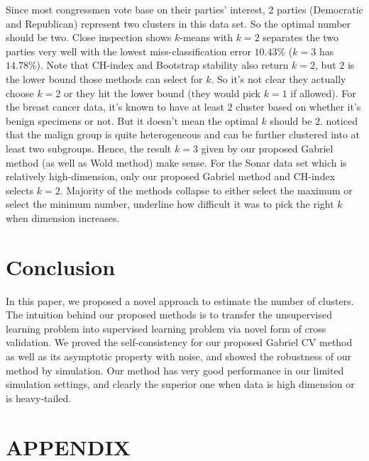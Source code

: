 \documentclass[11pt]{article}
\begin{document}
Since most congressmen vote base on their parties' interest, $2$ parties
(Democratic and Republican) represent two clusters in this data set. So the
optimal number should be two. Close inspection shows $k$-means with
$k=2$ separates the two parties very well with the lowest miss-classification
error $10.43\%$ ($k=3$ has $14.78\%$). Note that CH-index and Bootstrap
stability also return $k=2$, but $2$ is the lower bound those methods can
select for $k$. So it's not clear they actually choose $k=2$ or they hit the
lower bound (they would pick $k=1$ if allowed). For the breast cancer data,
it's known to have at least $2$ cluster based on whether it's benign specimens
or not. But it doesn't mean the optimal $k$ should be $2$.
\cite{fujita2014non} noticed that the malign group is quite heterogeneous and
can be further clustered into at least two subgroups. Hence, the result $k=3$
given by our proposed Gabriel method (as well as Wold method) make sense. For
the Sonar data set which is relatively high-dimension, only our proposed
Gabriel method and CH-index selects $k=2$. Majority of the methods collapse to
either select the maximum or select the minimum number, underline how
difficult it was to pick the right $k$ when dimension increases. 


\section{Conclusion}

In this paper, we proposed a novel approach to estimate the number of
clusters. The intuition behind our proposed methods is to transfer the
unsupervised learning problem into supervised learning problem via novel form
of cross validation. We proved the self-consistency for our proposed Gabriel
CV method as well as its asymptotic property with noise, and showed the
robustness of our method by simulation. Our method has very good performance
in our limited simulation settings, and clearly the superior one when data is
high dimension or is heavy-tailed.


\section*{\textbf{APPENDIX}}
\appendix
\end{document}
